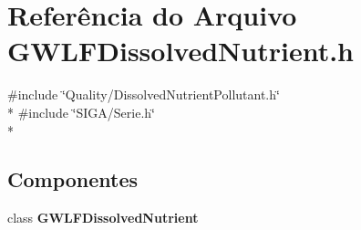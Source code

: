 \section{Referência do Arquivo G\+W\+L\+F\+Dissolved\+Nutrient.\+h}
\label{_g_w_l_f_dissolved_nutrient_8h}
{\ttfamily \#include \char`\"{}Quality/\+Dissolved\+Nutrient\+Pollutant.\+h\char`\"{}}\\*
{\ttfamily \#include \char`\"{}S\+I\+G\+A/\+Serie.\+h\char`\"{}}\\*
\subsection*{Componentes}
\begin{DoxyCompactItemize}
\item 
class {\bf G\+W\+L\+F\+Dissolved\+Nutrient}
\end{DoxyCompactItemize}
